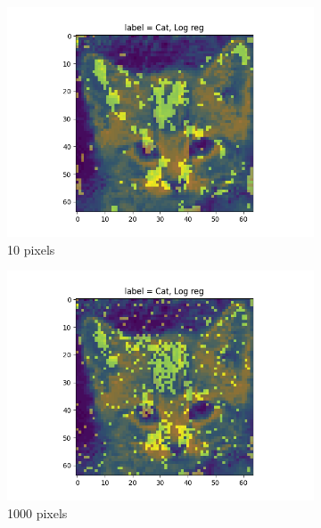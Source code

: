 \documentclass{article}
\begin{document}
\begin{figure}[H]
\begin{subfigure}{.33\textwidth}
  \centering
  \includegraphics[width=1\linewidth]{2d/,10, Log reg.png}  
  \caption{10 pixels}
  \label{fig:sub-first}
\end{subfigure}
\begin{subfigure}{.33\textwidth}
  \centering
  \includegraphics[width=1\linewidth]{2d/,1000, Log reg.png}  
  \caption{1000 pixels}
  \label{fig:sub-second}
\end{subfigure}
\begin{subfigure}{.33\textwidth}
  \centering

\end{subfigure}
\end{figure}
\end{document}
